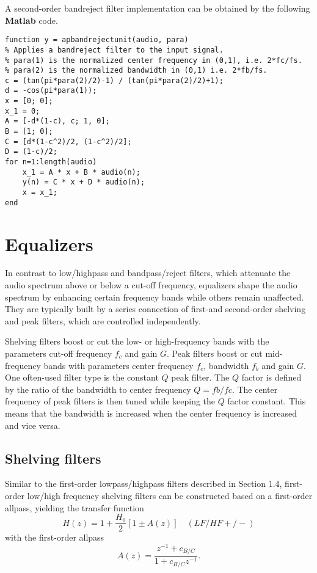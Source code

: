 \documentclass[10pt,a4paper,oneside]{article}
\begin{document}
A second-order bandreject filter implementation can be obtained by the following {\bfseries Matlab} code.
\begin{lstlisting}
function y = apbandrejectunit(audio, para)
% Applies a bandreject filter to the input signal.
% para(1) is the normalized center frequency in (0,1), i.e. 2*fc/fs.
% para(2) is the normalized bandwidth in (0,1) i.e. 2*fb/fs.
c = (tan(pi*para(2)/2)-1) / (tan(pi*para(2)/2)+1);
d = -cos(pi*para(1));
x = [0; 0];
x_1 = 0;
A = [-d*(1-c), c; 1, 0];
B = [1; 0];
C = [d*(1-c^2)/2, (1-c^2)/2];
D = (1-c)/2;
for n=1:length(audio)
	x_1 = A * x + B * audio(n);
	y(n) = C * x + D * audio(n);
	x = x_1;
end
\end{lstlisting}
\section{Equalizers}
In contrast to low/highpass and bandpass/reject filters, which attenuate the audio spectrum above or below a cut-off frequency, equalizers shape the audio spectrum by enhancing certain frequency bands while others remain unaffected. They are typically built by a series connection of first-and second-order shelving and peak filters, which are controlled independently.

Shelving filters boost or cut the low- or high-frequency bands with the parameters cut-off frequency $f_c$ and gain $G$. Peak filters boost or cut mid-frequency bands with parameters center frequency $f_c$, bandwidth $f_b$ and gain $G$. One often-used filter type is the constant $Q$ peak filter. The $Q$ factor is defined by the ratio of the bandwidth to center frequency $Q = fb/fc$. The center frequency of peak filters is then tuned while keeping the $Q$ factor constant. This means that the bandwidth is increased when the center frequency is increased and vice versa.
\subsection{Shelving filters}
Similar to the first-order lowpass/highpass filters described in Section 1.4, first-order low/high
frequency shelving filters can be constructed based on a first-order allpass, yielding the
transfer function
\[
H(z) = 1 + \frac{H_0}{2}[1 \pm A(z)]\quad(LF/HF+/-)
\]
with the first-order allpass
\[
A(z) = \frac{z^{-1} + c_{B/C}}{1 + c_{B/C}z^{-1}}.
\]
\end{document}
